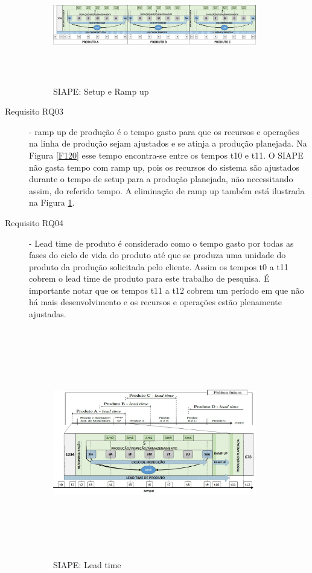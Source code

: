 \documentclass[10pt,letterpaper,twocolumn]{IEEEtran}
\begin{document}
\begin{description}
	\begin{figure}[h]
		\centering
		\includegraphics[width=8.9cm, height=5cm]{MeDSE_imagens/F125_SIAPE_CICLO_EXPLODIDOH.jpg} 
		\caption{SIAPE: Setup e Ramp up}
		\label{F125}
	\end{figure}	
	
	\item[Requisito RQ03] - ramp up de produção é o tempo gasto para que os recursos e operações na linha de produção sejam ajustados e se atinja a produção planejada. Na Figura \ref{F120} esse tempo encontra-se entre os tempos t10 e t11.  O SIAPE não gasta tempo com ramp up, pois os recursos do sistema são ajustados durante o tempo de setup para a produção planejada, não necessitando assim, do referido tempo. A eliminação de ramp up também está ilustrada na Figura \ref{F125}.
	
	
	\item[Requisito RQ04] -  Lead time de produto é considerado como o tempo gasto por todas as fases do ciclo de vida do produto  até que se produza uma unidade do produto da produção solicitada pelo cliente. Assim os tempos t0 a t11 cobrem o lead time de produto para este trabalho de pesquisa.  É importante notar que os tempos t11 a t12 cobrem um período em que não há mais desenvolvimento e os recursos e operações estão plenamente ajustadas.	
	
	
	\begin{figure}[h]
		\centering
		\includegraphics[width=8.9cm, height=10cm]{MeDSE_imagens/F120_2_SIAPE_CICLO_EXPLODIDO.jpg} 
		\caption{SIAPE: Lead time}
		\label{F120_1}
	\end{figure}	
	

\end{description}
\end{document}
